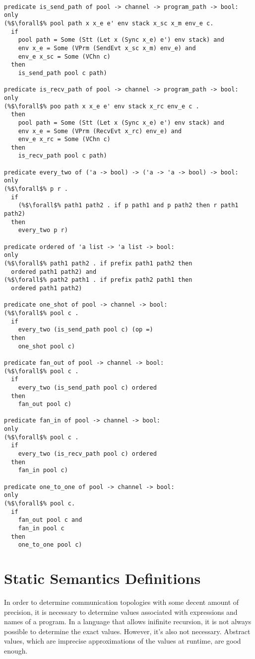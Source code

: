 \documentclass{article}
\begin{document}
\begin{lstlisting}[language=logic, style=codestyle1, escapechar=\%]

predicate is_send_path of pool -> channel -> program_path -> bool:
only
(%$\forall$% pool path x x_e e' env stack x_sc x_m env_e c.
  if
    pool path = Some (Stt (Let x (Sync x_e) e') env stack) and
    env x_e = Some (VPrm (SendEvt x_sc x_m) env_e) and 
    env_e x_sc = Some (VChn c)
  then
    is_send_path pool c path)

predicate is_recv_path of pool -> channel -> program_path -> bool:
only
(%$\forall$% poo path x x_e e' env stack x_rc env_e c .
  then
    pool path = Some (Stt (Let x (Sync x_e) e') env stack) and
    env x_e = Some (VPrm (RecvEvt x_rc) env_e) and
    env_e x_rc = Some (VChn c)
  then
    is_recv_path pool c path)

predicate every_two of ('a -> bool) -> ('a -> 'a -> bool) -> bool:
only
(%$\forall$% p r .
  if
    (%$\forall$% path1 path2 . if p path1 and p path2 then r path1 path2)
  then
    every_two p r)

predicate ordered of 'a list -> 'a list -> bool:
only
(%$\forall$% path1 path2 . if prefix path1 path2 then
  ordered path1 path2) and
(%$\forall$% path2 path1 . if prefix path2 path1 then
  ordered path1 path2)

predicate one_shot of pool -> channel -> bool:
(%$\forall$% pool c .
  if
    every_two (is_send_path pool c) (op =)
  then
    one_shot pool c)

predicate fan_out of pool -> channel -> bool:
(%$\forall$% pool c .
  if
    every_two (is_send_path pool c) ordered
  then
    fan_out pool c)
  
predicate fan_in of pool -> channel -> bool:
only
(%$\forall$% pool c .
  if
    every_two (is_recv_path pool c) ordered
  then
    fan_in pool c)

predicate one_to_one of pool -> channel -> bool:
only
(%$\forall$% pool c.
  if
    fan_out pool c and 
    fan_in pool c
  then
    one_to_one pool c)

\end{lstlisting}

\section{Static Semantics Definitions}

In order to determine communication topologies with some decent amount of precision, it is
necessary to determine values associated with expressions and names of a program.  In a
language that allows inifinite recursion, it is not always possible to determine the exact
values.  However, it's also not necessary.  Abstract values, which are imprecise approximations
of the values at runtime, are good enough.
\end{document}

